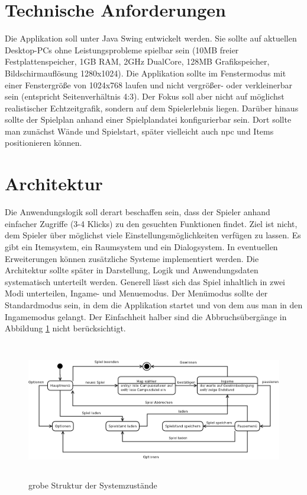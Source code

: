 \section{Technische Anforderungen}
Die Applikation soll unter Java Swing entwickelt werden. Sie sollte auf 
aktuellen Desktop-PCs ohne Leistungsprobleme spielbar sein (10MB freier 
Festplattenspeicher, 1GB RAM, 2GHz DualCore, 128MB Grafikspeicher, 
Bildschirmauflösung 1280x1024). Die Applikation sollte im Fenstermodus mit einer Fenstergröße von 1024x768
laufen und nicht vergrößer- oder verkleinerbar sein (entspricht Seitenverhältnis 4:3).
Der Fokus soll aber nicht auf möglichst realistischer Echtzeitgrafik, sondern auf dem Spielerlebnis liegen.
Darüber hinaus sollte der Spielplan anhand einer Spielplandatei konfigurierbar sein. 
Dort sollte man zunächst Wände und Spielstart, später vielleicht auch \acrlong{npc} und \glspl{Item} 
positionieren können.

\section{Architektur}
Die Anwendungslogik soll derart beschaffen sein, dass der Spieler anhand einfacher Zugriffe (3-4 Klicks)
zu den gesuchten Funktionen findet. Ziel ist nicht, dem Spieler über möglichst viele Einstellungsmöglichkeiten
verfügen zu lassen. Es gibt ein Itemsystem, ein Raumsystem und ein Dialogsystem. In eventuellen Erweiterungen
können zusätzliche Systeme implementiert werden. Die Architektur sollte später in Darstellung, Logik und 
Anwendungsdaten systematisch unterteilt werden. Generell lässt sich das Spiel inhaltlich in zwei Modi 
unterteilen, Ingame- und \gls{Menuemodus}. Der Menümodus sollte der Standardmodus sein, in dem die Applikation
startet und von dem aus man in den Ingamemodus gelangt. Der Einfachheit halber sind die Abbruchsübergänge in
Abbildung \ref{fig:zustaende_entwurf} nicht berücksichtigt.

\begin{figure}[h]
	\begin{center} 
		\includegraphics[width=150mm, height=60mm]
                  {kapitel/grundlagen/architektur.png}
	\end{center}
	\caption{grobe Struktur der Systemzustände}
	\label{fig:zustaende_entwurf}
\end{figure}


